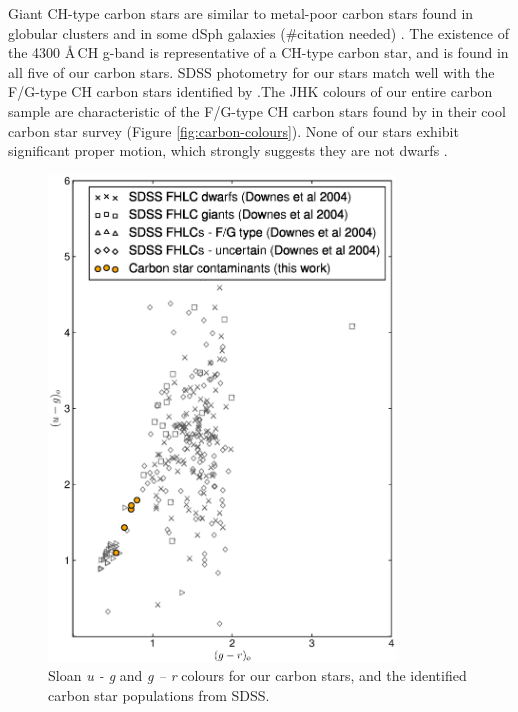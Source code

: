 \documentclass{emulateapj}
\begin{document}
	Giant CH-type carbon stars are similar to metal-poor carbon stars found in globular clusters \citep{Harding_1962} and in some dSph galaxies (\#citation needed) . The existence of the 4300 \AA\,CH g-band is representative of a CH-type carbon star, and is found in all five of our carbon stars. SDSS photometry for our stars match well with the F/G-type CH carbon stars identified by \citet{Downes;et-al_2004}.The JHK colours of our entire carbon sample are characteristic of the F/G-type CH carbon stars found by \citet{Totten;Irwin_1998} in their cool carbon star survey (Figure \ref{fig:carbon-colours}). None of our stars exhibit significant proper motion, which strongly suggests they are not dwarfs \citep{Green;et-al_1994, Deutsch_1994}. 


\begin{figure}[h]
	\includegraphics[width=9.2cm]{./figures/carbonstarcolor.eps}
	\caption{Sloan \textit{u \-- g} and \textit{g \--- r} colours for our carbon stars, and the identified carbon star populations from SDSS.}
	\label{fig:carbon-sdss}
\end{figure}
\end{document}

